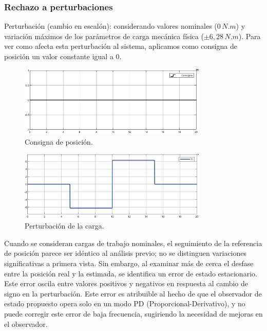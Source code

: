 \documentclass{article}
\begin{document}

\subsubsection{Rechazo a perturbaciones}

Perturbación (cambio en escalón): considerando valores nominales ($0\,N.m$) y variación máximos de 
los parámetros de carga mecánica física  ($\pm 6,28\,N.m$). Para ver como afecta esta perturbación al 
sistema, aplicamos como consigna de posición un  valor constante igual a $0$.

\begin{figure}[H]
    \centering
    \includegraphics[width=0.8\textwidth]{5.2.4.b.1.png}
    \caption{Consigna de posición.}
\end{figure}

\begin{figure}[H]
    \centering
    \includegraphics[width=0.8\textwidth]{5.2.4.b.2.png}
    \caption{Perturbación de la carga.}
\end{figure}

Cuando se consideran cargas de trabajo nominales, el seguimiento de la referencia de posición parece 
ser idéntico al análisis previo; no se distinguen variaciones significativas a primera vista. Sin 
embargo, al examinar más de cerca el desfase entre la posición real y la estimada, se identifica un 
error de estado estacionario. Este error oscila entre valores positivos y negativos en respuesta al 
cambio de signo en la perturbación. Este error es atribuible al hecho de que el observador de estado 
propuesto opera solo en un modo PD (Proporcional-Derivativo), y no puede corregir este error de baja 
frecuencia, sugiriendo la necesidad de mejoras en el observador.
\end{document}
